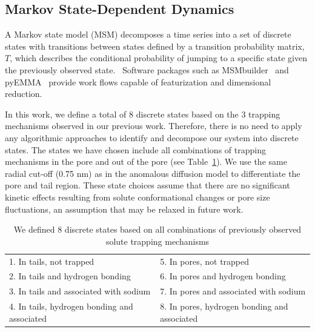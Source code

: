\documentclass{article}
\begin{document}
  \subsection{Markov State-Dependent Dynamics}\label{method:MSMs}  

  A Markov state model (MSM) decomposes a time series into a set of discrete states
  with transitions between states defined by a transition probability matrix, $T$,
  which describes the conditional probability of jumping to a specific state given
  the previously observed state.~\cite{pande_everything_2010,wehmeyer_introduction_2018}
  Software packages such as MSMbuilder~\cite{beauchamp_msmbuilder2:_2011} and 
  pyEMMA~\cite{scherer_pyemma_2015} provide work flows capable of featurization and
  dimensional reduction.

  In this work, we define a total of 8 discrete states based on the 3 trapping
  mechanisms observed in our previous work. Therefore, there is no need to 
  apply any algorithmic approaches to identify and decompose our system into 
  discrete states. The states we have chosen include all combinations of trapping
  mechanisms in the pore and out of the pore (see Table~\ref{table:states}). We use
  the same radial cut-off (0.75 nm) as in the anomalous diffusion model to differentiate
  the pore and tail region. These state choices assume that there are no significant
  kinetic effects resulting from solute conformational changes or pore size fluctuations,
  an assumption that may be relaxed in future work.
  
  \begin{table}[!htb]
	  \centering
	  \begin{tabular}{|l|l|}
	  \hline
	  1. In tails, not trapped                     & 5. In pores, not trapped                     \\
	  2. In tails and hydrogen bonding             & 6. In pores and hydrogen bonding             \\
	  3. In tails and associated with sodium       & 7. In pores and associated with sodium       \\
	  4. In tails, hydrogen bonding and associated & 8. In pores, hydrogen bonding and associated \\
	  \hline
	  \end{tabular}
	  \caption{We defined 8 discrete states based on all combinations of previously observed solute
	  trapping mechanisms}\label{table:states}  
  \end{table}
  
\end{document}
